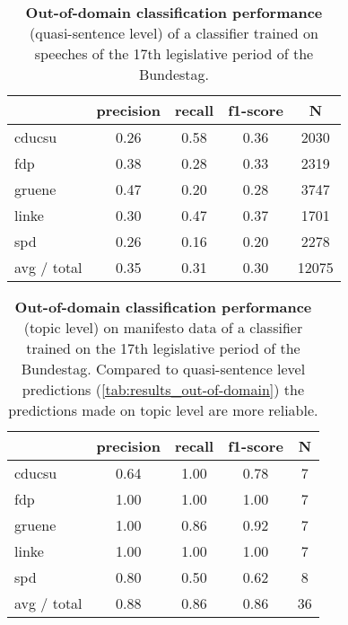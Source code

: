 \documentclass[11pt]{article}
\begin{document}
\begin{table}[t]
\caption{
\label{tab:results_out-of-domain}
{\bf Out-of-domain classification performance} (quasi-sentence level) of a classifier trained on speeches of the 17th legislative period of the Bundestag.
}
\begin{center}
\begin{tabular}{lcccc}
    &         precision    &recall &  f1-score  & N  \\
\hline \hline
    cducsu    &   0.26   &   0.58   &   0.36    &   2030 \\
    fdp    &   0.38   &   0.28   &   0.33    &   2319 \\
     gruene   &    0.47    &  0.20   &   0.28    &  3747\\
      linke     &  0.30  &    0.47    &  0.37    &   1701\\
        spd     &  0.26  &    0.16   &   0.20    &   2278\\
\hline
avg / total    &   0.35  &    0.31  &    0.30   &   12075\\
%
\end{tabular}
\end{center}

\end{table}

\begin{table}[t]
\caption{
\label{tab:results_topic}
{\bf Out-of-domain classification performance} (topic level) on manifesto data of a classifier trained on the 17th legislative period of the Bundestag. Compared to quasi-sentence level predictions (\autoref{tab:results_out-of-domain}) the predictions made on topic level are more reliable.}
\begin{center}
\begin{tabular}{lcccc}
    &         precision    &recall &  f1-score  & N  \\
    \hline
        \hline
cducsu     &  0.64  &    1.00  &    0.78    &     7\\
       fdp    &   1.00    &  1.00    &  1.00    &     7\\
    gruene  &     1.00  &    0.86  &    0.92    &     7\\
     linke    &   1.00   &   1.00     & 1.00    &     7\\
       spd   &    0.80   &   0.50    &  0.62     &    8\\
    \hline
    avg / total  &     0.88   &   0.86   &   0.86  &      36\\
\end{tabular}
\end{center}

\end{table}
\end{document}
